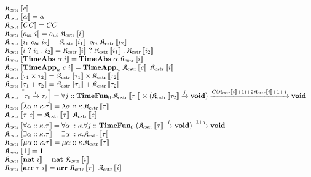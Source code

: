 \documentclass[fleqn]{article}
\begin{document}
\[
\begin{array}{l}
    \cpsc{c} \\
    \cpsc{\alpha} = \alpha \\
    \cpsc{CC} = CC \\
    \cpsc{o_{ui}~i} = o_{ui}~\cpsc{i} \\
    \cpsc{i_1~o_{bi}~i_2} = \cpsc{i_1}~o_{bi}~\cpsc{i_2} \\
    \cpsc{i~?~i_1 : i_2} = \cpsc{i}~?~\cpsc{i_1} : \cpsc{i_2} \\
    \cpsc{\mathbf{TimeAbs}~\alpha.i} = \mathbf{TimeAbs}~\alpha.\cpsc{i} \\
    \cpsc{\mathbf{TimeApp}_n~c~i} = \mathbf{TimeApp}_n~\cpsc{c}~\cpsc{i} \\
    \cpsc{\tau_1 \times \tau_2} = \cpsc{\tau_1} \times \cpsc{\tau_2} \\
    \cpsc{\tau_1 + \tau_2} = \cpsc{\tau_1} + \cpsc{\tau_2} \\
    \cpsc{\tau_1 \xrightarrow{i} \tau_2} = \forall j :: \mathbf{TimeFun}_0. \cpsc{\tau_1} \times (\cpsc{\tau_2} \xrightarrow{j} \mathbf{void}) \xrightarrow{C(\cpsc{i}+1) + 2\cpsc{i} + 1 + j} \mathbf{void} \\
    \cpsc{\lambda \alpha :: \kappa. \tau} = \lambda \alpha :: \kappa. \cpsc{\tau} \\
    \cpsc{\tau~c} = \cpsc{\tau}~\cpsc{c} \\
    \cpsc{\forall \alpha :: \kappa. \tau} = \forall \alpha :: \kappa. \forall j :: \mathbf{TimeFun}_0. (\cpsc{\tau} \xrightarrow{j} \mathbf{void}) \xrightarrow{1 + j} \mathbf{void} \\
    \cpsc{\exists \alpha :: \kappa. \tau} = \exists \alpha :: \kappa. \cpsc{\tau} \\
    \cpsc{\mu \alpha :: \kappa. \tau} = \mu \alpha :: \kappa. \cpsc{\tau} \\
    \cpsc{\mathbf{1}} = \mathbf{1} \\
    \cpsc{\mathbf{nat}~i} = \mathbf{nat}~\cpsc{i} \\
    \cpsc{\mathbf{arr}~\tau~i} = \mathbf{arr}~\cpsc{\tau}~\cpsc{i}
\end{array}
\]
\end{document}
